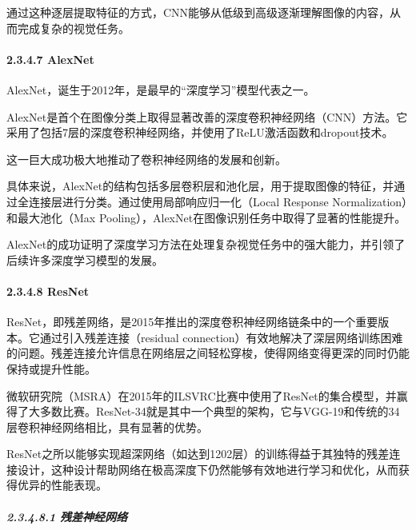 通过这种逐层提取特征的方式，CNN能够从低级到高级逐渐理解图像的内容，从而完成复杂的视觉任务。

\paragraph{\texorpdfstring{\textbf{2.3.4.7
AlexNet}}{2.3.4.7 AlexNet}}\label{2347-alexnet}


AlexNet，诞生于2012年，是最早的``深度学习''模型代表之一。

AlexNet是首个在图像分类上取得显著改善的深度卷积神经网络（CNN）方法。它采用了包括7层的深度卷积神经网络，并使用了ReLU激活函数和dropout技术。

这一巨大成功极大地推动了卷积神经网络的发展和创新。

具体来说，AlexNet的结构包括多层卷积层和池化层，用于提取图像的特征，并通过全连接层进行分类。通过使用局部响应归一化（Local
Response Normalization）和最大池化（Max
Pooling），AlexNet在图像识别任务中取得了显著的性能提升。

AlexNet的成功证明了深度学习方法在处理复杂视觉任务中的强大能力，并引领了后续许多深度学习模型的发展。

\paragraph{\texorpdfstring{\textbf{2.3.4.8
ResNet}}{2.3.4.8 ResNet}}\label{2348-resnet}


ResNet，即残差网络，是2015年推出的深度卷积神经网络链条中的一个重要版本。它通过引入残差连接（residual
connection）有效地解决了深层网络训练困难的问题。残差连接允许信息在网络层之间轻松穿梭，使得网络变得更深的同时仍能保持或提升性能。

微软研究院（MSRA）在2015年的ILSVRC比赛中使用了ResNet的集合模型，并赢得了大多数比赛。ResNet-34就是其中一个典型的架构，它与VGG-19和传统的34层卷积神经网络相比，具有显著的优势。

ResNet之所以能够实现超深网络（如达到1202层）的训练得益于其独特的残差连接设计，这种设计帮助网络在极高深度下仍然能够有效地进行学习和优化，从而获得优异的性能表现。

\subparagraph{\texorpdfstring{\textbf{2.3.4.8.1}
\textbf{残差神经网络}}{2.3.4.8.1 残差神经网络}}\label{23481-ux6b8bux5deeux795eux7ecfux7f51ux7edc}

